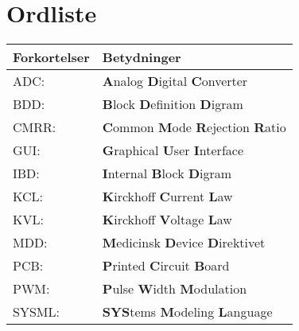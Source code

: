 \section*{Ordliste}
\begin{center}
		\begin{longtable}{ | m{6.5cm} | m{6.5cm}| } 
			\hline
			\textbf{Forkortelser} &\textbf{Betydninger} \\ 
			\hline	
			ADC: & \textbf{A}nalog \textbf{D}igital \textbf{C}onverter  \\ 
							
			\hline
			BDD: & \textbf{B}lock \textbf{D}efinition \textbf{D}igram \\
\hline
			CMRR: & \textbf{C}ommon \textbf{M}ode \textbf{R}ejection \textbf{R}atio \\ 			
			\hline
			GUI: & \textbf{G}raphical \textbf{U}ser \textbf{I}nterface \\
			\hline
			
			IBD: & \textbf{I}nternal \textbf{B}lock \textbf{D}igram \\  
\hline
			KCL: & \textbf{K}irckhoff \textbf{C}urrent \textbf{L}aw \\ 
			\hline
			KVL: & \textbf{K}irckhoff \textbf{V}oltage \textbf{L}aw \\ 			
			\hline
			MDD: & \textbf{M}edicinsk \textbf{D}evice \textbf{D}irektivet \\ 			
			\hline
			PCB: & \textbf{P}rinted \textbf{C}ircuit \textbf{B}oard \\ 			
			
			\hline
			PWM: & \textbf{P}ulse \textbf{W}idth \textbf{M}odulation \\ 
			
			\hline
			SYSML: & \textbf{SYS}tems \textbf{M}odeling \textbf{L}anguage \\ 
			
			
			
			
			
			 
			
			
			
			
			
			\hline
		\end{longtable}
\end{center}